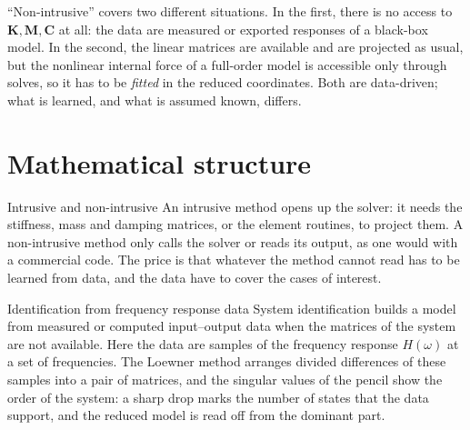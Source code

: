 ``Non-intrusive'' covers two different situations. In the first, there is no access to $\bm K,\bm M,\bm C$ at all: the data are measured or exported responses of a black-box model. In the second, the linear matrices are available and are projected as usual, but the nonlinear internal force of a full-order model is accessible only through solves, so it has to be \emph{fitted} in the reduced coordinates. Both are data-driven; what is learned, and what is assumed known, differs.

\section{Mathematical structure}\label{sec:ni-math}

\begin{sidenote}{Intrusive and non-intrusive}
An intrusive method opens up the solver: it needs the stiffness, mass and damping matrices, or the element routines, to project them. A non-intrusive method only calls the solver or reads its output, as one would with a commercial code. The price is that whatever the method cannot read has to be learned from data, and the data have to cover the cases of interest.
\end{sidenote}

\begin{sidenote}{Identification from frequency response data}
System identification builds a model from measured or computed input--output data when the matrices of the system are not available. Here the data are samples of the frequency response $H(\omega)$ at a set of frequencies. The Loewner method arranges divided differences of these samples into a pair of matrices, and the singular values of the pencil show the order of the system: a sharp drop marks the number of states that the data support, and the reduced model is read off from the dominant part.
\end{sidenote}

